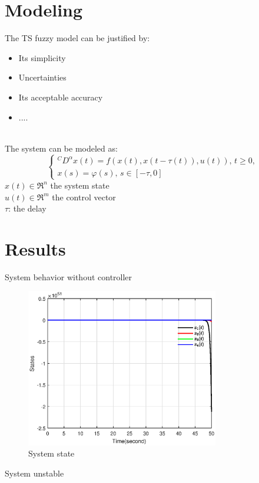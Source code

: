\documentclass[dvipsnames,mathserif]{beamer}
\begin{document}
{    \section{Modeling}
    \begin{frame}
      \footnotesize
      The TS fuzzy model can be justified by:
      \begin{itemize}
        \item Its simplicity
        \item Uncertainties
        \item Its acceptable accuracy
        \item ....
      \end{itemize}
      \pause
      \quad \\
      The system can be modeled as:
      \begin{equation*}
        \left\{\begin{array}{l}
            { }^C D^\alpha x(t)=f(x(t),x(t-\tau(t)),u(t)),\, t \geq 0, \\
            x(s)=\varphi(s),\, s \in[-\tau, 0]
        \end{array}\right.
      \end{equation*}
      $x(t) \in \Re ^{n}$ the system state\\
      $u(t) \in \Re ^{m}$ the control vector \\
      $\tau$: the delay
    \end{frame}

    \section{Results}

    \begin{frame}
      \footnotesize
      System behavior without controller
      \begin{figure}[H]
        \centering
        \includegraphics[width=0.75\textwidth]{x_1.eps}
        \caption{System state}
      \end{figure}
      System unstable
    \end{frame}

}
\end{document}
